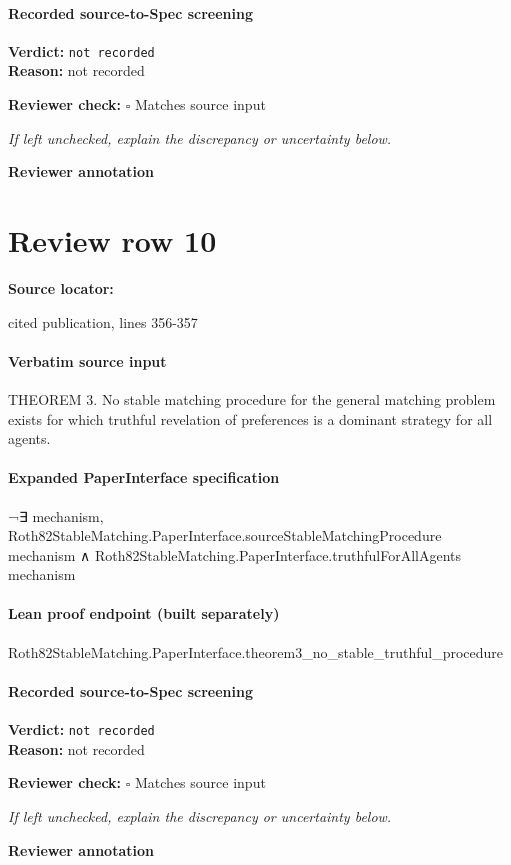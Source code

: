 \documentclass[10pt]{article}
\newcommand{\reviewerbox}{%
  \par\noindent\fbox{\parbox{0.96\linewidth}{\rule{0pt}{0.38in}}}\par
}
\newcommand{\reviewmatch}[1]{%
  \par\noindent\textbf{Reviewer check:} $\square$\; #1\par
  \noindent\emph{If left unchecked, explain the discrepancy or uncertainty below.}\par
}
\begin{document}
\paragraph{Recorded source-to-Spec screening}
\textbf{Verdict:} \texttt{not recorded}
\\
\textbf{Reason:} not recorded
\reviewmatch{Matches source input}
\noindent\textbf{Reviewer annotation}\par
\reviewerbox
\clearpage
\hypertarget{source-claim-fd8851b538d7c013}{}
\section*{Review row 10}
\textbf{Source locator:} {\footnotesize\raggedright cited publication, lines 356-\allowbreak{}357\par}
\paragraph{Verbatim source input}
\begin{ReviewVerbatim}
THEOREM 3. No stable matching procedure for the general matching problem exists
for which truthful revelation of preferences is a dominant strategy for all agents.
\end{ReviewVerbatim}


\paragraph{Expanded PaperInterface specification}
\begin{ReviewVerbatim}
¬∃ mechanism,
    Roth82StableMatching.PaperInterface.sourceStableMatchingProcedure mechanism ∧
      Roth82StableMatching.PaperInterface.truthfulForAllAgents mechanism
\end{ReviewVerbatim}

\paragraph{Lean proof endpoint (built separately)}\begin{ReviewVerbatim}
Roth82StableMatching.PaperInterface.theorem3_no_stable_truthful_procedure
\end{ReviewVerbatim}

\paragraph{Recorded source-to-Spec screening}
\textbf{Verdict:} \texttt{not recorded}
\\
\textbf{Reason:} not recorded
\reviewmatch{Matches source input}
\noindent\textbf{Reviewer annotation}\par
\reviewerbox
\clearpage
\hypertarget{source-claim-3a4281641c18a9e6}{}
\end{document}
